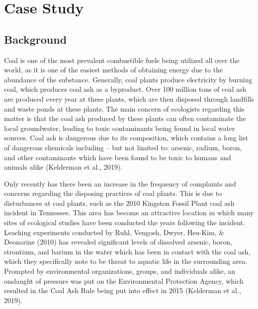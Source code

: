 \documentclass[12pt, twoside]{amherstthesis}
\begin{document}
\hypertarget{casestudy}{%
\chapter{Case Study}\label{casestudy}}

\hypertarget{background}{%
\section{Background}\label{background}}

Coal is one of the most prevalent combustible fuels being utilized all over the world, as it is one of the easiest methods of obtaining energy due to the abundance of the substance. Generally, coal plants produce electricity by burning coal, which produces coal ash as a byproduct. Over 100 million tons of coal ash are produced every year at these plants, which are then disposed through landfills and waste ponds at these plants. The main concern of ecologists regarding this matter is that the coal ash produced by these plants can often contaminate the local groundwater, leading to toxic contaminants being found in local water sources. Coal ash is dangerous due to its composition, which contains a long list of dangerous chemicals including -- but not limited to: arsenic, radium, boron, and other contaminants which have been found to be toxic to humans and animals alike (Kelderman et al., 2019).

Only recently has there been an increase in the frequency of complaints and concerns regarding the disposing practices of coal plants. This is due to disturbances at coal plants, such as the 2010 Kingston Fossil Plant coal ash incident in Tennessee. This area has become an attractive location in which many sites of ecological studies have been conducted the years following the incident. Leaching experiments conducted by Ruhl, Vengosh, Dwyer, Hsu-Kim, \& Deonarine (2010) has revealed significant levels of dissolved arsenic, boron, strontium, and barium in the water which has been in contact with the coal ash, which they specifically note to be threat to aquatic life in the surrounding area. Prompted by environmental organizations, groups, and individuals alike, an onslaught of pressure was put on the Environmental Protection Agency, which resulted in the Coal Ash Rule being put into effect in 2015 (Kelderman et al., 2019).
\end{document}
